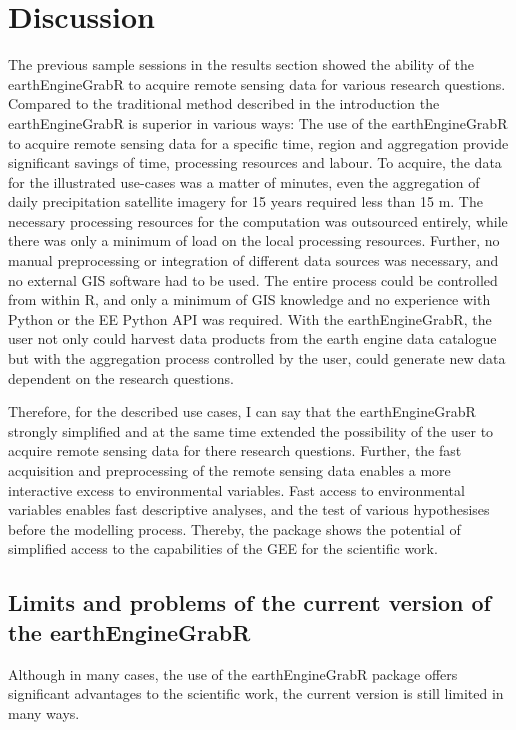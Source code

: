 \chapter{Discussion}


The previous sample sessions in the results section showed the ability of the earthEngineGrabR to acquire remote sensing data for various research questions.
Compared to the traditional method described in the introduction the earthEngineGrabR is superior in various ways:
The use of the earthEngineGrabR to acquire remote sensing data for a specific time, region and aggregation provide significant savings of time, processing resources and labour. To acquire, the data for the illustrated use-cases was a matter of minutes, even the aggregation of daily precipitation satellite imagery for 15 years required less than 15 m. The necessary processing resources for the computation was outsourced entirely, while there was only a minimum of load on the local processing resources. Further, no manual preprocessing or integration of different data sources was necessary, and no external GIS software had to be used. The entire process could be controlled from within R, and only a minimum of GIS knowledge and no experience with Python or the EE Python API was required. With the earthEngineGrabR, the user not only could harvest data products from the earth engine data catalogue but with the aggregation process controlled by the user, could generate new data dependent on the research questions. 

Therefore, for the described use cases, I can say that the earthEngineGrabR strongly simplified and at the same time extended the possibility of the user to acquire remote sensing data for there research questions. Further, the fast acquisition and preprocessing of the remote sensing data enables a more interactive excess to environmental variables.
Fast access to environmental variables enables fast descriptive analyses, and the test of various hypothesises before the modelling process.
Thereby, the package shows the potential of simplified access to the capabilities of the GEE for the scientific work.


\section{Limits and problems of the current version of the earthEngineGrabR}

Although in many cases, the use of the earthEngineGrabR package offers significant advantages to the scientific work, the current version is still limited in many ways. 

